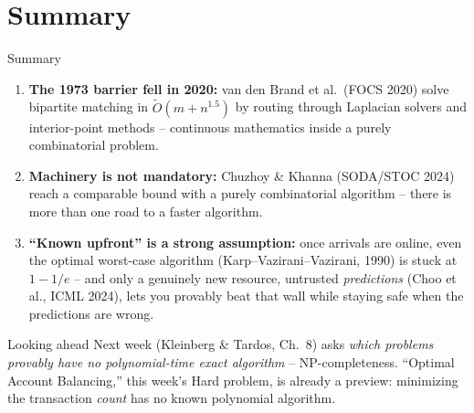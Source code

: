 \documentclass[11pt,aspectratio=169]{beamer}
\begin{document}
\section{Summary}

\begin{frame}{Summary}
  \small
  \begin{enumerate}
    \item \textbf{The 1973 barrier fell in 2020:} van den Brand et al.\ (FOCS 2020)
    solve bipartite matching in $\tilde O(m+n^{1.5})$ by routing through Laplacian
    solvers and interior-point methods -- continuous mathematics inside a purely
    combinatorial problem.
    \item \textbf{Machinery is not mandatory:} Chuzhoy \& Khanna (SODA/STOC 2024) reach
    a comparable bound with a purely combinatorial algorithm -- there is more than one
    road to a faster algorithm.
    \item \textbf{``Known upfront'' is a strong assumption:} once arrivals are online,
    even the optimal worst-case algorithm (Karp--Vazirani--Vazirani, 1990) is stuck at
    $1-1/e$ -- and only a genuinely new resource, untrusted \emph{predictions}
    (Choo et al., ICML 2024), lets you provably beat that wall while staying safe when
    the predictions are wrong.
  \end{enumerate}
  \begin{alertblock}{Looking ahead}
    Next week (Kleinberg \& Tardos, Ch.\ 8) asks \emph{which problems provably have no
    polynomial-time exact algorithm} -- NP-completeness. ``Optimal Account Balancing,''
    this week's Hard problem, is already a preview: minimizing the transaction
    \emph{count} has no known polynomial algorithm.
  \end{alertblock}
\end{frame}
\end{document}
